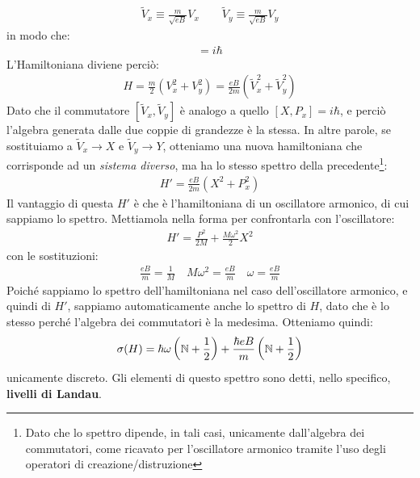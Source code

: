 \documentclass[../../FisicaTeorica.tex]{subfiles}
\begin{document}
\begin{enumerate}
\begin{align*}
\tilde{V}_x \equiv \frac{m}{\sqrt{eB}}V_x \qquad \tilde{V}_y \equiv \frac{m}{\sqrt{eB}}V_y
\end{align*}
in modo che:
\begin{align*}
[\tilde{V}_x, \tilde{V}_y] = i\hbar
\end{align*}
L'Hamiltoniana diviene perciò:
\begin{align*}
H=\frac{m}{2}(V_x^2 + V_y^2) = \frac{eB}{2m}(\tilde{V}_x^2 + \tilde{V}_y^2)
\end{align*}
Dato che il commutatore $[\tilde{V}_x, \tilde{V}_y]$ è analogo a quello $[X,P_x] = i\hbar$, e perciò l'algebra generata dalle due coppie di grandezze è la stessa. In altre parole, se sostituiamo a $\tilde{V}_x \to X$ e $\tilde{V}_y \to Y$, otteniamo una nuova hamiltoniana che corrisponde ad un \textit{sistema diverso}, ma ha lo stesso spettro della precedente\footnote{Dato che lo spettro dipende, in tali casi, unicamente dall'algebra dei commutatori, come ricavato per l'oscillatore armonico tramite l'uso degli operatori di creazione/distruzione}:
\begin{align*}
H'=\frac{eB}{2m}(X^2+P_x^2)
\end{align*} 
Il vantaggio di questa $H'$ è che è l'hamiltoniana di un oscillatore armonico, di cui sappiamo lo spettro. Mettiamola nella forma per confrontarla con l'oscillatore:
\begin{align*}
H'=\frac{P^2}{2M} + \frac{M\omega^2}{2}X^2
\end{align*}
con le sostituzioni:
\begin{align*}
\frac{eB}{m} = \frac{1}{M}\quad M\omega^2 = \frac{eB}{m}\quad \omega = \frac{eB}{m}
\end{align*}
Poiché sappiamo lo spettro dell'hamiltoniana nel caso dell'oscillatore armonico, e quindi di $H'$, sappiamo automaticamente anche lo spettro di $H$, dato che è lo stesso perché l'algebra dei commutatori è la medesima. Otteniamo quindi:
\begin{align*}
\sigma(H) = \hbar \omega\left(\mathbb{N}+\frac{1}{2}\right) + \frac{\hbar eB}{m}\left(\mathbb{N}+\frac{1}{2}\right)
\end{align*}
unicamente discreto. Gli elementi di questo spettro sono detti, nello specifico, \textbf{livelli di Landau}.\\


\end{enumerate}
\end{document}

